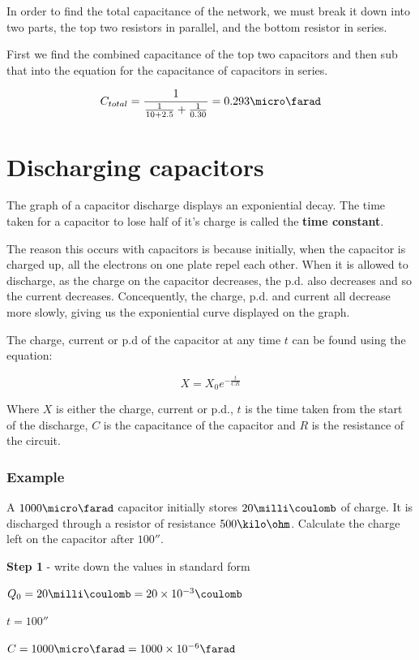 \documentclass{article}
\begin{document}
In order to find the total capacitance of the network, we must break it down
into two parts, the top two resistors in parallel, and the bottom resistor in
series.

First we find the combined capacitance of the top two capacitors and then sub
that into the equation for the capacitance of capacitors in series.

\[
	C_{total} = \frac{1}{ \frac{1}{10 + 2.5} + \frac{1}{0.30} } = 0.293\micro\farad
\]

\section*{Discharging capacitors}

The graph of a capacitor discharge displays an exponiential decay. The time
taken for a capacitor to lose half of it's charge is called the {\bf time
constant}.

The reason this occurs with capacitors is because initially, when the capacitor
is charged up, all the electrons on one plate repel each other. When it is
allowed to discharge, as the charge on the capacitor decreases,  the p.d. also
decreases and so the current decreases. Concequently, the charge, p.d. and
current all decrease more slowly, giving us the exponiential curve displayed on
the graph.

The charge, current or p.d of the capacitor at any time $t$ can be found using
the equation:

\[
	X = X_0e^{-\frac{t}{CR}}
\]

Where $X$ is either the charge, current or p.d., $t$ is the time taken from the
start of the discharge, $C$ is the capacitance of the capacitor and $R$ is the
resistance of the circuit.

\subsubsection*{Example}

A $1000\micro\farad$ capacitor initially stores $20\milli\coulomb$ of charge. It
is discharged through a resistor of resistance $500\kilo\ohm$. Calculate the
charge left on the capacitor after $100\second$.

{\bf Step 1} - write down the values in standard form

$Q_0 = 20\milli\coulomb = 20\times10^{-3}\coulomb$

$t = 100\second$

$C = 1000\micro\farad = 1000\times10^{-6}\farad$
\end{document}
